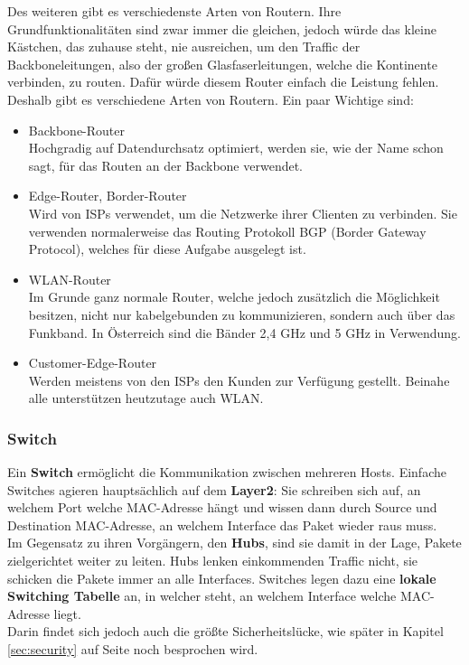 \documentclass[12pt,a4paper]{report}
\begin{document}
\begin{onehalfspace}
Des weiteren gibt es verschiedenste Arten von Routern. Ihre Grundfunktionalitäten sind zwar immer die gleichen, jedoch würde das kleine Kästchen, das zuhause steht, nie ausreichen, um den Traffic der Backboneleitungen, also der großen Glasfaserleitungen, welche die Kontinente verbinden, zu routen. Dafür würde diesem Router einfach die Leistung fehlen.\\
Deshalb gibt es verschiedene Arten von Routern. Ein paar Wichtige sind:\\
\begin{itemize}
\item Backbone-Router\\
Hochgradig auf Datendurchsatz optimiert, werden sie, wie der Name schon sagt, für das Routen an der Backbone verwendet.
\item Edge-Router, Border-Router\\
Wird von ISPs verwendet, um die Netzwerke ihrer Clienten zu verbinden. Sie verwenden normalerweise das Routing Protokoll BGP (Border Gateway Protocol), welches für diese Aufgabe ausgelegt ist.
\item WLAN-Router\\
Im Grunde ganz normale Router, welche jedoch zusätzlich die Möglichkeit besitzen, nicht nur kabelgebunden zu kommunizieren, sondern auch über das Funkband. In Österreich sind die Bänder 2,4 GHz und 5 GHz in Verwendung.
\item Customer-Edge-Router\\
Werden meistens von den ISPs den Kunden zur Verfügung gestellt. Beinahe alle unterstützen heutzutage auch WLAN.
\end{itemize}
\subsubsection{Switch}
Ein \textbf{Switch} ermöglicht die Kommunikation zwischen mehreren Hosts. Einfache Switches agieren hauptsächlich auf dem \textbf{Layer2}: Sie schreiben sich auf, an welchem Port welche MAC-Adresse hängt und wissen dann durch Source und Destination MAC-Adresse, an welchem Interface das Paket wieder raus muss.\\

Im Gegensatz zu ihren Vorgängern, den \textbf{Hubs}, sind sie damit in der Lage, Pakete zielgerichtet weiter zu leiten. Hubs lenken einkommenden Traffic nicht, sie schicken die Pakete immer an alle Interfaces. Switches legen dazu eine \textbf{lokale Switching Tabelle} an, in welcher steht, an welchem Interface welche MAC-Adresse liegt.\\
Darin findet sich jedoch auch die größte Sicherheitslücke, wie später in Kapitel \ref{sec:security} auf Seite \pageref{sec:security} noch besprochen wird.\\


\end{onehalfspace}
\end{document}
